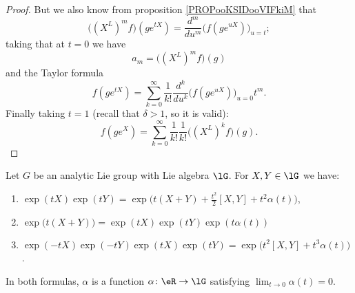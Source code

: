 \begin{proof}
    But we also know from proposition \ref{PROPooKSIDooVIFkiM} that
    \begin{equation}
        \big( (X^L)^mf \big)(g e^{tX})=\frac{ d^m }{ du^m }\big( f(g e^{uX}) \big)_{u=t};
    \end{equation}
    taking that at \( t=0\) we have
    \begin{equation}
        a_m=\big( (X^L)^mf \big)(g)
    \end{equation}
    and the Taylor formula
    \begin{equation}
        f(g e^{tX})=\sum_{k=0}^{\infty}\frac{1}{ k! }\frac{ d^k }{ du^k }\big( f(g e^{uX}) \big)_{u=0}t^m.
    \end{equation}
    Finally taking \( t=1\) (recall that \( \delta>1\), so it is valid):
    \begin{equation}
        f(g e^{X})=\sum_{k=0}^{\infty}\frac{1}{ k! }\frac{1}{ k! }\big( (X^L)^kf \big)(g).
    \end{equation}
\end{proof}

\begin{lemma}     \label{LEMooMJBRooMOuJpa}
    Let \( G\) be an analytic Lie group with Lie algebra \( \lG\). For \( X,Y\in \lG\) we have:
    \begin{enumerate}
        \item       \label{ITEMooHVOIooKDrUSw}
            \( \exp(tX)\exp(tY)=\exp\big( t(X+Y)+\frac{ t^2 }{2}[X,Y]+t^2\alpha(t) \big)\),
        \item       \label{ITEMooWIQIooHphJcP}
            \( \exp\big( t(X+Y) \big)=\exp(tX)\exp(tY)\exp(t\alpha(t))\)
        \item       \label{ITEMooVMDCooExpIrp}
            \( \exp(-tX)\exp(-tY)\exp(tX)\exp(tY)=\exp\big( t^2[X,Y]+t^3\alpha(t) \big)\).
    \end{enumerate}
    In both formulas, \( \alpha\) is a function \( \alpha\colon \eR\to \lG\) satisfying \( \lim_{t\to 0} \alpha(t)=0\).
\end{lemma}

